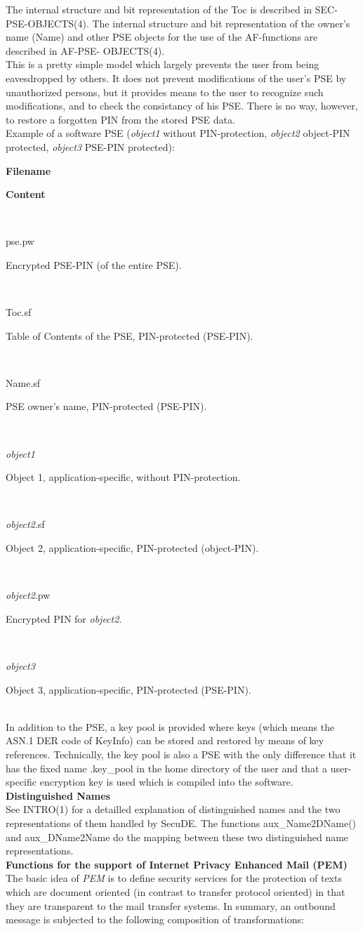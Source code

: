 The internal structure and bit representation of the Toc is described in 
SEC-PSE-OBJECTS(4). 
The internal structure and bit representation of the owner's name (Name) 
and other
PSE objects for the use of the AF-functions are described in AF-PSE-
OBJECTS(4).
\\ [1em]
This is a pretty simple model which largely prevents the user from being 
eavesdropped by
others. It does not prevent modifications of the user's PSE by unauthorized
persons, but it provides means to the user to recognize such modifications, 
and to check
the consistancy of his PSE. There is no way, however, to restore a 
forgotten PIN from
the stored PSE data.
\\ [1em]
Example of a software PSE ({\em object1} without PIN-protection, 
{\em object2} object-PIN protected, {\em object3} PSE-PIN protected): 
\\[1em]
{\small
\parbox[t]{4cm}{
{\bf Filename}
}
\parbox[t]{10.8cm}{
{\bf Content}
} \\
\parbox[t]{4cm}{
pse.pw
}
\parbox[t]{10.8cm}{
Encrypted PSE-PIN (of the entire PSE).
} \\
\parbox[t]{4cm}{
Toc.sf
}
\parbox[t]{10.8cm}{
Table of Contents of the PSE, PIN-protected (PSE-PIN).
} \\
\parbox[t]{4cm}{
Name.sf
}
\parbox[t]{10.8cm}{
PSE owner's name, PIN-protected (PSE-PIN).
} \\
\parbox[t]{4cm}{
{\em object1}
}
\parbox[t]{10.8cm}{
Object 1, application-specific, without PIN-protection.
} \\
\parbox[t]{4cm}{
{\em object2}.sf
}
\parbox[t]{10.8cm}{
Object 2, application-specific, PIN-protected (object-PIN).
} \\
\parbox[t]{4cm}{
{\em object2}.pw
}
\parbox[t]{10.8cm}{
Encrypted PIN for {\em object2}.
} \\
\parbox[t]{4cm}{
{\em object3}
}
\parbox[t]{10.8cm}{
Object 3, application-specific, PIN-protected (PSE-PIN).
}
} \\ [1em]
In addition to the PSE, a key pool is provided where keys (which means the 
ASN.1 DER code
of KeyInfo) can be stored and restored by means of key references. 
Technically, the key pool is also a
PSE with the only difference that it has the fixed name .key\_pool in the 
home directory of the user and that a user-specific encryption key is used 
which is compiled into the
software. 
\\ [1em]
{\bf Distinguished Names} 
\\ [1em]
See INTRO(1) for a detailled explanation of distinguished names and
the two representations of them handled by SecuDE.
The functions aux\_Name2DName() and aux\_DName2Name do the mapping
between these two distinguished name representations.
\\ [1em]
{\bf Functions for the support of Internet Privacy Enhanced Mail (PEM)} 
\\ [1em]
The basic idea of {\em PEM} is to define security services
for the protection of texts
which are document oriented (in contrast to transfer protocol oriented)
in that they are transparent to the mail transfer systems.
In summary, an outbound message is subjected to the following
composition of transformations:

